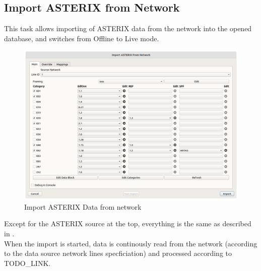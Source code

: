 \subsection{Import ASTERIX from Network}
\label{sec:ui_import_asterix_network}


This task allows importing of ASTERIX data from the network into the opened database, and switches from Offline to Live mode. \\

\begin{figure}[H]
  \center
    \hspace*{-0.5cm}
    \includegraphics[width=17cm]{figures/asterix_import_data_network.png}
  \caption{Import ASTERIX Data from network}
\end{figure}

Except for the ASTERIX source at the top, everything is the same as described in . \\

When the import is started, data is continously read from the network (according to the data source network lines specficiation) and processed according to TODO\_LINK.
